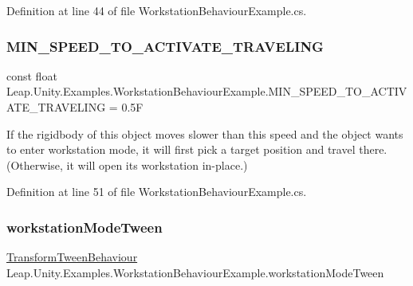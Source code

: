 Definition at line 44 of file Workstation\+Behaviour\+Example.\+cs.

\mbox{\label{class_leap_1_1_unity_1_1_examples_1_1_workstation_behaviour_example_a4643c3dd568f8e77904018de48eb4318}} 
\subsubsection{\texorpdfstring{MIN\_SPEED\_TO\_ACTIVATE\_TRAVELING}{MIN\_SPEED\_TO\_ACTIVATE\_TRAVELING}}
{\footnotesize\ttfamily const float Leap.\+Unity.\+Examples.\+Workstation\+Behaviour\+Example.\+M\+I\+N\+\_\+\+S\+P\+E\+E\+D\+\_\+\+T\+O\+\_\+\+A\+C\+T\+I\+V\+A\+T\+E\+\_\+\+T\+R\+A\+V\+E\+L\+I\+NG = 0.\+5F}



If the rigidbody of this object moves slower than this speed and the object wants to enter workstation mode, it will first pick a target position and travel there. (Otherwise, it will open its workstation in-\/place.) 



Definition at line 51 of file Workstation\+Behaviour\+Example.\+cs.

\mbox{\label{class_leap_1_1_unity_1_1_examples_1_1_workstation_behaviour_example_adbc6d2fc02014c49f40507fdeece6e75}} 
\subsubsection{\texorpdfstring{workstationModeTween}{workstationModeTween}}
{\footnotesize\ttfamily \mbox{\hyperlink{class_leap_1_1_unity_1_1_animation_1_1_transform_tween_behaviour}{Transform\+Tween\+Behaviour}} Leap.\+Unity.\+Examples.\+Workstation\+Behaviour\+Example.\+workstation\+Mode\+Tween}



